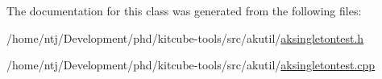 The documentation for this class was generated from the following files\-:\begin{DoxyCompactItemize}
\item 
/home/ntj/\-Development/phd/kitcube-\/tools/src/akutil/\hyperlink{aksingletontest_8h}{aksingletontest.\-h}\item 
/home/ntj/\-Development/phd/kitcube-\/tools/src/akutil/\hyperlink{aksingletontest_8cpp}{aksingletontest.\-cpp}\end{DoxyCompactItemize}
